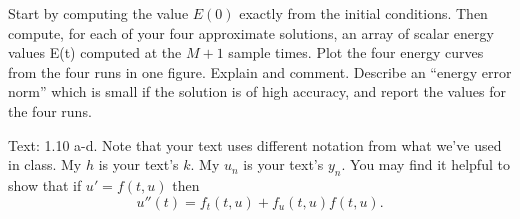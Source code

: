 \documentclass[minion]{homework}
\begin{document}
\begin{problems}
\begin{subproblems}
Start by computing the value $E(0)$ exactly from the initial conditions. Then compute, for each of your four approximate
solutions, an array of scalar energy values E(t) computed at the 
$M+1$ sample times.  Plot the four energy curves from the four runs in one figure. Explain and comment. Describe an ``energy error norm'' which is small if the solution is of high accuracy, and report the values for the four runs.

\end{subproblems}

\problem Text: 1.10 a-d.  Note that your text uses different notation from what we've used in class.  My $h$ is your text's $k$. My $u_n$ is your text's $y_n$.
You may find it helpful to show that if $u'=f(t,u)$ then
\[
u''(t) = f_t(t,u) + f_u(t,u)f(t,u).
\]

\end{problems}
\end{document}
